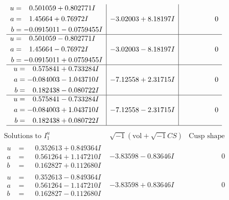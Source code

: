 \documentclass[1p]{elsarticle_modified}
\theoremstyle{definition}
\newcommand{\I}{\sqrt{-1}}
\begin{document}
$$\begin{array}{c|c|c}
\begin{aligned}
u &= \phantom{-}0.501059 + 0.802771 I \\
a &= \phantom{-}1.45664 + 0.76972 I \\
b &= -0.0915011 - 0.0759455 I\end{aligned}
 & -3.02003 + 8.18197 I & \phantom{-0.000000 } 0 \\ \hline\begin{aligned}
u &= \phantom{-}0.501059 - 0.802771 I \\
a &= \phantom{-}1.45664 - 0.76972 I \\
b &= -0.0915011 + 0.0759455 I\end{aligned}
 & -3.02003 - 8.18197 I & \phantom{-0.000000 } 0 \\ \hline\begin{aligned}
u &= \phantom{-}0.575841 + 0.733284 I \\
a &= -0.084003 - 1.043710 I \\
b &= \phantom{-}0.182438 - 0.080722 I\end{aligned}
 & -7.12558 + 2.31715 I & \phantom{-0.000000 } 0 \\ \hline\begin{aligned}
u &= \phantom{-}0.575841 - 0.733284 I \\
a &= -0.084003 + 1.043710 I \\
b &= \phantom{-}0.182438 + 0.080722 I\end{aligned}
 & -7.12558 - 2.31715 I & \phantom{-0.000000 } 0\\
 \hline 
 \end{array}$$\newpage$$\begin{array}{c|c|c}  
\text{Solutions to }I^u_{1}& \I (\text{vol} + \sqrt{-1}CS) & \text{Cusp shape}\\
 \hline 
\begin{aligned}
u &= \phantom{-}0.352613 + 0.849364 I \\
a &= \phantom{-}0.561264 + 1.147210 I \\
b &= \phantom{-}0.162827 + 0.112680 I\end{aligned}
 & -3.83598 - 0.83646 I & \phantom{-0.000000 } 0 \\ \hline\begin{aligned}
u &= \phantom{-}0.352613 - 0.849364 I \\
a &= \phantom{-}0.561264 - 1.147210 I \\
b &= \phantom{-}0.162827 - 0.112680 I\end{aligned}
 & -3.83598 + 0.83646 I & \phantom{-0.000000 } 0 \\ \hline\begin{aligned}

\end{aligned}
\end{array}$$
\end{document}

